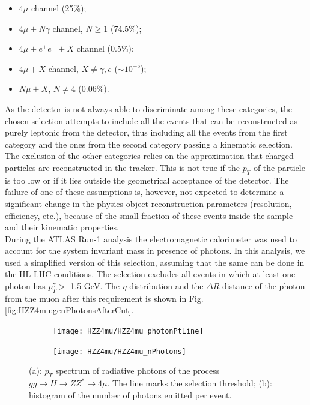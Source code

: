\documentclass[a4paper,twoside,12pt]{book}
\begin{document}
\begin{itemize}
\item $4\mu$ channel (25\%);
\item $4\mu + N\gamma$ channel, $N \geq 1$ (74.5\%);
\item $4\mu + e^+e^- + X$ channel (0.5\%);
\item $4\mu + X$ channel, $X \neq \gamma, e$ ($\sim 10^{-5}$);
\item $N\mu + X$, $N \neq 4$ (0.06\%).
\end{itemize}

As the detector is not always able to discriminate among these categories, the chosen selection attempts to include all the events that can be reconstructed as purely leptonic from
the detector, thus including all the events
from the first category and the ones from the second category passing a kinematic 
selection. The exclusion of the other categories relies on the approximation that charged
particles are reconstructed in the tracker. This is not true if the $p_{T}$ of the particle is 
too low or if it lies outside the geometrical acceptance of the detector. The failure of one 
of these assumptions is, however, not expected to determine a significant change in the
physics object reconstruction parameters (resolution, efficiency, etc.), because of the
small fraction of these events inside the sample and their kinematic properties. \\

During the ATLAS Run-1 analysis the electromagnetic calorimeter was used to account for the system invariant mass in presence of photons\cite{HZZ4mu_run1}. In
this analysis, we used a simplified version of this selection, assuming that the same
can be done in the HL-LHC conditions. The selection excludes all events in which at least one photon has $p_{T}^{\gamma} >$ 1.5 GeV. The $\eta$ distribution
and the $\Delta R$ distance of the photon from the muon after this requirement is shown in Fig.\ref{fig:HZZ4mu:genPhotonsAfterCut}.\\

\begin{figure}
\centering
\begin{subfigure}{.5\textwidth}
  \centering
  \texttt{[image: HZZ4mu/HZZ4mu\_photonPtLine]}
  \caption{}
  \label{fig:HZZ4mu:photonPt}
\end{subfigure}%
\begin{subfigure}{.5\textwidth}
  \centering
  \texttt{[image: HZZ4mu/HZZ4mu\_nPhotons]}
  \caption{}
  \label{fig:HZZ4mu:nPhotons}
\end{subfigure}
\caption{(a): $p_T$ spectrum of radiative photons of the process \\
 \mbox{$gg \rightarrow H \rightarrow ZZ^* \rightarrow 4\mu$}. The line
 marks the selection threshold; 
	(b): histogram of the number of photons emitted per event.}
\label{fig:HZZ4mu:genPhotons}
\end{figure}
\end{document}
